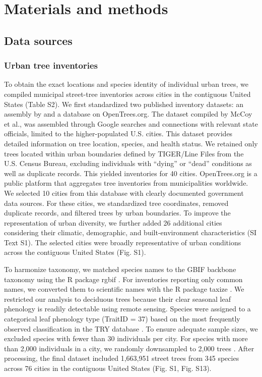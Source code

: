 \section{Materials and methods}

\subsection{Data sources}

\subsubsection{Urban tree inventories}

To obtain the exact locations and species identity of individual urban trees, we compiled municipal street-tree inventories across cities in the contiguous United States (Table S2). We first standardized two published inventory datasets: an assembly by \citet{McCoy2022eLife} and a database on OpenTrees.org. The dataset compiled by McCoy et al., was assembled through Google searches and connections with relevant state officials, limited to the higher-populated U.S. cities. This dataset provides detailed information on tree location, species, and health status. We retained only trees located within urban boundaries defined by TIGER/Line Files from the U.S. Census Bureau, excluding individuals with “dying” or “dead” conditions as well as duplicate records. This yielded inventories for 40 cities. OpenTrees.org is a public platform that aggregates tree inventories from municipalities worldwide. We selected 10 cities from this database with clearly documented government data sources. For these cities, we standardized tree coordinates, removed duplicate records, and filtered trees by urban boundaries. To improve the representation of urban diversity, we further added 26 additional cities considering their climatic, demographic, and built-environment characteristics (SI Text S1). The selected cities were broadly representative of urban conditions across the contiguous United States (Fig. S1).

To harmonize taxonomy, we matched species names to the GBIF backbone taxonomy using the R package rgbif \citep{Chamberlain2024rgbif}. For inventories reporting only common names, we converted them to scientific names with the R package taxize \citep{Chamberlain2025taxize}. We restricted our analysis to deciduous trees because their clear seasonal leaf phenology is readily detectable using remote sensing. Species were assigned to a categorical leaf phenology type (TraitID = 37) based on the most frequently observed classification in the TRY database \citep{Kattge2011GCB}. To ensure adequate sample sizes, we excluded species with fewer than 30 individuals per city. For species with more than 2,000 individuals in a city, we randomly downsampled to 2,000 trees \citep{psutka_sample_2019}. After processing, the final dataset included 1,663,951 street trees from 345 species across 76 cities in the contiguous United States (Fig. S1, Fig. S13).

